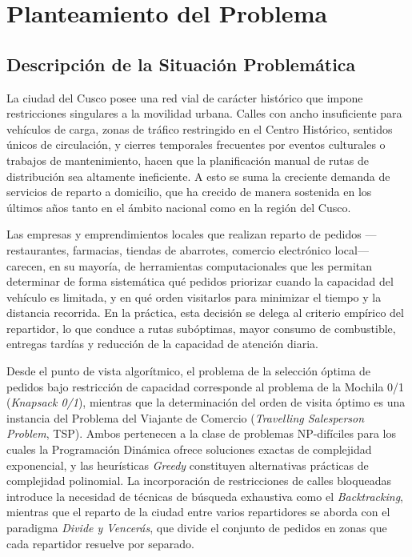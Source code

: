 \chapter{Planteamiento del Problema}

\section{Descripción de la Situación Problemática}

La ciudad del Cusco posee una red vial de carácter histórico que impone restricciones singulares a la movilidad urbana. Calles con ancho insuficiente para vehículos de carga, zonas de tráfico restringido en el Centro Histórico, sentidos únicos de circulación, y cierres temporales frecuentes por eventos culturales o trabajos de mantenimiento, hacen que la planificación manual de rutas de distribución sea altamente ineficiente. A esto se suma la creciente demanda de servicios de reparto a domicilio, que ha crecido de manera sostenida en los últimos años tanto en el ámbito nacional como en la región del Cusco.

Las empresas y emprendimientos locales que realizan reparto de pedidos —restaurantes, farmacias, tiendas de abarrotes, comercio electrónico local— carecen, en su mayoría, de herramientas computacionales que les permitan determinar de forma sistemática qué pedidos priorizar cuando la capacidad del vehículo es limitada, y en qué orden visitarlos para minimizar el tiempo y la distancia recorrida. En la práctica, esta decisión se delega al criterio empírico del repartidor, lo que conduce a rutas subóptimas, mayor consumo de combustible, entregas tardías y reducción de la capacidad de atención diaria.

Desde el punto de vista algorítmico, el problema de la selección óptima de pedidos bajo restricción de capacidad corresponde al problema de la Mochila 0/1 (\textit{Knapsack 0/1}), mientras que la determinación del orden de visita óptimo es una instancia del Problema del Viajante de Comercio (\textit{Travelling Salesperson Problem}, TSP). Ambos pertenecen a la clase de problemas NP-difíciles para los cuales la Programación Dinámica ofrece soluciones exactas de complejidad exponencial, y las heurísticas \textit{Greedy} constituyen alternativas prácticas de complejidad polinomial. La incorporación de restricciones de calles bloqueadas introduce la necesidad de técnicas de búsqueda exhaustiva como el \textit{Backtracking}, mientras que el reparto de la ciudad entre varios repartidores se aborda con el paradigma \textit{Divide y Vencerás}, que divide el conjunto de pedidos en zonas que cada repartidor resuelve por separado.

